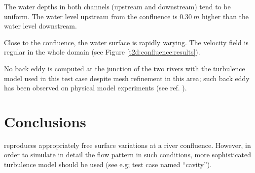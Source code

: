 The water depths in both channels (upstream and downstream) tend to be uniform.
The water level upstream from the confluence is $0.30~m$ higher than the water
level downstream.

Close to the confluence, the water surface is rapidly varying.
The velocity field is regular in the whole domain (see Figure
\ref{t2d:confluence:results}).

No back eddy is computed at the junction of the two rivers with the turbulence
model used in this test case despite mesh refinement in this area; such back
eddy has been observed on physical model experiments (see ref.
\cite{KumarGurram1997}).
%
\section{Conclusions}
 reproduces appropriately free surface variations at a river
confluence. However, in order to simulate in detail the flow pattern in such
conditions, more sophisticated turbulence model should be used (see e.g; test
case named ``cavity'').
%
